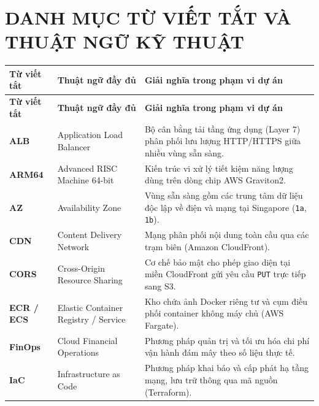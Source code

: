 \documentclass[12pt,a4paper]{report}
\begin{document}

\tableofcontents
\clearpage

\listoffigures
\clearpage

\listoftables
\clearpage

\chapter*{DANH MỤC TỪ VIẾT TẮT VÀ THUẬT NGỮ KỸ THUẬT}

\begin{longtable}{|L{2.4cm}|L{4.8cm}|L{7.2cm}|}
  \hline
  \textbf{Từ viết tắt} & \textbf{Thuật ngữ đầy đủ} & \textbf{Giải nghĩa trong phạm vi dự án} \\
  \hline
  \endfirsthead
  \hline
  \textbf{Từ viết tắt} & \textbf{Thuật ngữ đầy đủ} & \textbf{Giải nghĩa trong phạm vi dự án} \\
  \hline
  \endhead
  \textbf{ALB} & Application Load Balancer & Bộ cân bằng tải tầng ứng dụng (Layer 7) phân phối lưu lượng HTTP/HTTPS giữa nhiều vùng sẵn sàng. \\ \hline
  \textbf{ARM64} & Advanced RISC Machine 64-bit & Kiến trúc vi xử lý tiết kiệm năng lượng dùng trên dòng chip AWS Graviton2. \\ \hline
  \textbf{AZ} & Availability Zone & Vùng sẵn sàng gồm các trung tâm dữ liệu độc lập về điện và mạng tại Singapore (\texttt{1a}, \texttt{1b}). \\ \hline
  \textbf{CDN} & Content Delivery Network & Mạng phân phối nội dung toàn cầu qua các trạm biên (Amazon CloudFront). \\ \hline
  \textbf{CORS} & Cross-Origin Resource Sharing & Cơ chế bảo mật cho phép giao diện tại miền CloudFront gửi yêu cầu \texttt{PUT} trực tiếp sang S3. \\ \hline
  \textbf{ECR / ECS} & Elastic Container Registry / Service & Kho chứa ảnh Docker riêng tư và cụm điều phối container không máy chủ (AWS Fargate). \\ \hline
  \textbf{FinOps} & Cloud Financial Operations & Phương pháp quản trị và tối ưu hóa chi phí vận hành đám mây theo số liệu thực tế. \\ \hline
  \textbf{IaC} & Infrastructure as Code & Phương pháp khai báo và cấp phát hạ tầng mạng, lưu trữ thông qua mã nguồn (Terraform). \\ \hline

\end{longtable}
\end{document}
